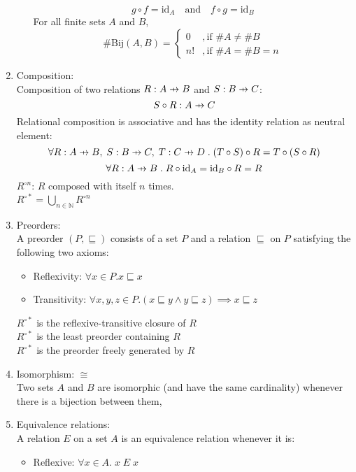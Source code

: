 \documentclass{article}
\newcommand\pfun{\mathrel{\ooalign{\hfil$\mapstochar\mkern5mu$\hfil\cr$\to$\cr}}}
\begin{document}
\begin{enumerate}
\begin{itemize}[topsep=0pt]
                $$g\circ f=\text{id}_A\quad\text{and}\quad f\circ g=\text{id}_B$$
                For all finite sets $A$ and $B$,
                $$\#\text{Bij}(A,B)=\begin{cases}
                    0 &, \text{if }\#A\neq\#B\\
                    n! &, \text{if }\#A=\#B=n
                \end{cases}$$
        \end{itemize}
    \item Composition:\\
        Composition of two relations $R:A\pfun B$ and $S:B\pfun C$: 
            $$S\circ R:A\pfun C$$
        Relational composition is associative and has the identity relation as neutral element:
            $$\forall R:A\pfun B,\;S:B\pfun C,\;T:C\pfun D\;.\;(T\circ S)\circ R=T\circ(S\circ R)$$
            $$\forall R:A\pfun B\;.\;R\circ\text{id}_A=\text{id}_B\circ R=R$$
        $R^{\circ n}$: $R$ composed with itself $n$ times.\\
        $R^{\circ*}=\bigcup_{n\in\mathbb{N}}R^{\circ n}$
    \newpage
    \item Preorders:\\
        A preorder $(P,\sqsubseteq)$ consists of a set $P$ and a relation $\sqsubseteq$ on $P$ satisfying the following two axioms:
        \begin{itemize}[topsep=0pt]
            \item Reflexivity: $\forall x\in P.x\sqsubseteq x$
            \item Transitivity: $\forall x,y,z\in P.(x\sqsubseteq y\wedge y\sqsubseteq z)\implies x\sqsubseteq z$
        \end{itemize}
        $R^{\circ*}$ is the reflexive-transitive closure of $R$\\
        $R^{\circ*}$ is the least preorder containing $R$\\
        $R^{\circ*}$ is the preorder freely generated by $R$
    \item Isomorphism: $\cong$\\
        Two sets $A$ and $B$ are isomorphic (and have the same cardinality) whenever there is a bijection between them,
    \item Equivalence relations:\\
        A relation $E$ on a set $A$ is an equivalence relation whenever it is:
        \begin{itemize}[topsep=0pt]
            \item Reflexive: $\forall x\in A.\;x\;E\;x$

\end{itemize}
\end{enumerate}
\end{document}
